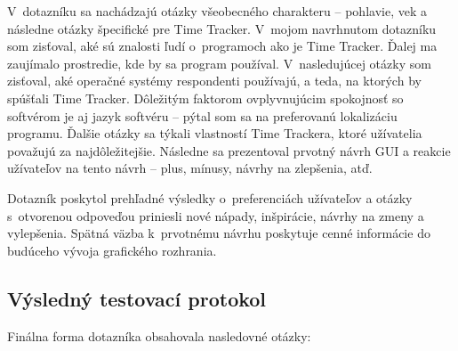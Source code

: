 \documentclass[]{article}
\begin{document}
V~dotazníku sa nachádzajú otázky všeobecného charakteru -- pohlavie, vek a následne otázky špecifické pre Time Tracker. V~mojom navrhnutom dotazníku som zisťoval, aké sú znalosti ľudí o~programoch ako je Time Tracker. Ďalej ma zaujímalo prostredie, kde by sa program používal.  V~nasledujúcej otázky som zisťoval, aké operačné systémy respondenti používajú, a teda, na ktorých by spúšťali Time Tracker. Dôležitým faktorom ovplyvnujúcim spokojnosť so softvérom je aj jazyk softvéru -- pýtal som sa na preferovanú lokalizáciu programu. Ďalšie otázky sa týkali vlastností Time Trackera, ktoré užívatelia považujú za najdôležitejšie. Následne sa prezentoval prvotný návrh GUI a reakcie užívateľov na tento návrh – plus, mínusy, návrhy na zlepšenia, atď.

Dotazník poskytol prehľadné výsledky o~preferenciách užívateľov a otázky s~otvorenou odpoveďou priniesli nové nápady, inšpirácie, návrhy na zmeny a vylepšenia. Spätná väzba k~prvotnému návrhu poskytuje cenné informácie do budúceho vývoja grafického rozhrania.

\subsection{Výsledný testovací protokol}
Finálna forma dotazníka obsahovala nasledovné otázky:
\end{document}
